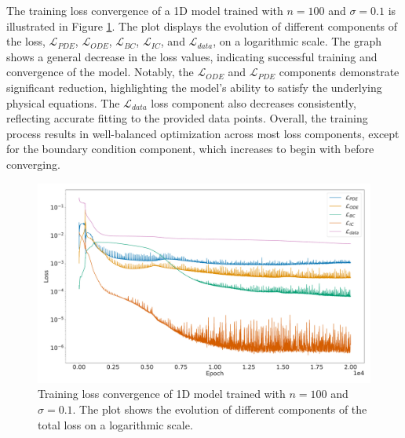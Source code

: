 The training loss convergence of a 1D model trained with \( n = 100 \) and \( \sigma = 0.1 \) is illustrated in Figure \ref{fig:loss_1D}. The plot displays the evolution of different components of the loss, \( \mathcal{L}_{PDE} \), \( \mathcal{L}_{ODE} \), \( \mathcal{L}_{BC} \), \( \mathcal{L}_{IC} \), and \( \mathcal{L}_{data} \), on a logarithmic scale. The graph shows a general decrease in the loss values, indicating successful training and convergence of the model. Notably, the \( \mathcal{L}_{ODE} \) and \( \mathcal{L}_{PDE} \) components demonstrate significant reduction, highlighting the model's ability to satisfy the underlying physical equations. The \( \mathcal{L}_{data} \) loss component also decreases consistently, reflecting accurate fitting to the provided data points. Overall, the training process results in well-balanced optimization across most loss components, except for the boundary condition component, which increases to begin with before converging.

\begin{figure}[H]
  \centering
  \includegraphics[width=\linewidth]{Figs/1D/loss_history_1D_100_01.pdf}
  \caption{Training loss convergence of 1D model trained with $n=100$ and $\sigma=0.1$. The plot shows the evolution of different components of the total loss on a logarithmic scale.}
  \label{fig:loss_1D}
\end{figure}

